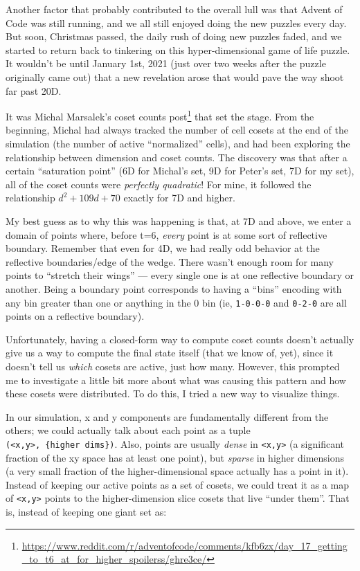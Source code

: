 \documentclass[]{article}
\renewcommand{\href}[2]{#2\footnote{\url{#1}}}
\begin{document}
Another factor that probably contributed to the overall lull was that Advent of
Code was still running, and we all still enjoyed doing the new puzzles every
day. But soon, Christmas passed, the daily rush of doing new puzzles faded, and
we started to return back to tinkering on this hyper-dimensional game of life
puzzle. It wouldn't be until January 1st, 2021 (just over two weeks after the
puzzle originally came out) that a new revelation arose that would pave the way
shoot far past 20D.

It was
\href{https://www.reddit.com/r/adventofcode/comments/kfb6zx/day_17_getting_to_t6_at_for_higher_spoilerss/ghre3ce/}{Michal
Marsalek's coset counts post} that set the stage. From the beginning, Michal had
always tracked the number of cell cosets at the end of the simulation (the
number of active ``normalized'' cells), and had been exploring the relationship
between dimension and coset counts. The discovery was that after a certain
``saturation point'' (6D for Michal's set, 9D for Peter's set, 7D for my set),
all of the coset counts were \emph{perfectly quadratic}! For mine, it followed
the relationship \(d^2 + 109d + 70\) exactly for 7D and higher.

My best guess as to why this was happening is that, at 7D and above, we enter a
domain of points where, before t=6, \emph{every} point is at some sort of
reflective boundary. Remember that even for 4D, we had really odd behavior at
the reflective boundaries/edge of the wedge. There wasn't enough room for many
points to ``stretch their wings'' --- every single one is at one reflective
boundary or another. Being a boundary point corresponds to having a ``bins''
encoding with any bin greater than one or anything in the 0 bin (ie,
\texttt{1-0-0-0} and \texttt{0-2-0} are all points on a reflective boundary).

Unfortunately, having a closed-form way to compute coset counts doesn't actually
give us a way to compute the final state itself (that we know of, yet), since it
doesn't tell us \emph{which} cosets are active, just how many. However, this
prompted me to investigate a little bit more about what was causing this pattern
and how these cosets were distributed. To do this, I tried a new way to
visualize things.

In our simulation, x and y components are fundamentally different from the
others; we could actually talk about each point as a tuple
\texttt{(\textless{}x,y\textgreater{},\ \{higher\ dims\})}. Also, points are
usually \emph{dense} in \texttt{\textless{}x,y\textgreater{}} (a significant
fraction of the xy space has at least one point), but \emph{sparse} in higher
dimensions (a very small fraction of the higher-dimensional space actually has a
point in it). Instead of keeping our active points as a set of cosets, we could
treat it as a map of \texttt{\textless{}x,y\textgreater{}} points to the
higher-dimension slice cosets that live ``under them''. That is, instead of
keeping one giant set as:
\end{document}
